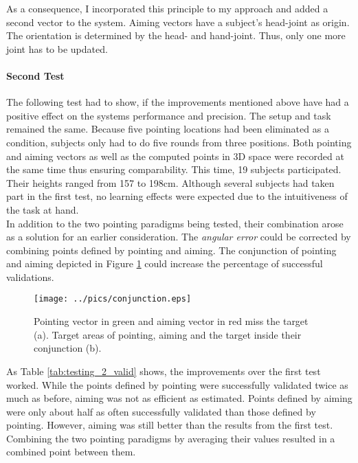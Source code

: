As a consequence, I incorporated this principle to my approach and added a second vector to the system. Aiming vectors have a subject's head-joint as origin. The orientation is determined by the head- and hand-joint. Thus, only one more joint has to be updated.

\paragraph{Second Test} The following test had to show, if the improvements mentioned above have had a positive effect on the systems performance and precision. The setup and task remained the same. Because five pointing locations had been eliminated as a condition, subjects only had to do five rounds from three positions. Both pointing and aiming vectors as well as the computed points in \ac{3D} space were recorded at the same time thus ensuring comparability. This time, 19 subjects participated. Their heights ranged from 157 to 198cm. Although several subjects had taken part in the first test, no learning effects were expected due to the intuitiveness of the task at hand. 
\\
In addition to the two pointing paradigms being tested, their combination arose as a solution for an earlier consideration. The \textit{angular error} could be corrected by combining points defined by pointing and aiming. The conjunction of pointing and aiming depicted in Figure \ref{fig:testing_2_conjunction} could increase the percentage of successful validations.
\begin{figure}[H]%
\texttt{[image: ../pics/conjunction.eps]}%
\caption{Pointing vector in green and aiming vector in red miss the target (a). Target areas of pointing, aiming and the target inside their conjunction (b).}%
\label{fig:testing_2_conjunction} %
\end{figure}

As Table \ref{tab:testing_2_valid} shows, the improvements over the first test worked. While the points defined by pointing were successfully validated twice as much as before, aiming was not as efficient as estimated. Points defined by aiming were only about half as often successfully validated than those defined by pointing. However, aiming was still better than the results from the first test. Combining the two pointing paradigms by averaging their values resulted in a combined point between them. 

